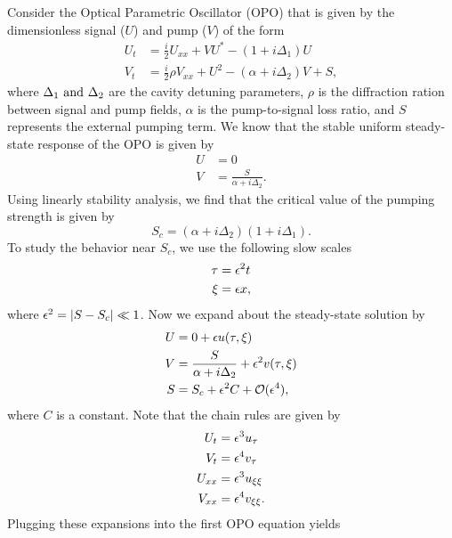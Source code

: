 \documentclass[12pt]{report}
\begin{document}
\begin{solution}
    
    \noindent
    Consider the Optical Parametric Oscillator (OPO) that is given by the dimensionless signal ($U$) and pump ($V$) of the form
    \begin{align*}
        U_t &= \frac{i}{2}U_{xx} + VU^* - (1 + i \Delta_1)U\\
        V_t &= \frac{i}{2}\rho V_{xx} + U^2 - (\alpha + i \Delta_2)V + S,
    \end{align*}
    where $\Delta_1 {~\text{and}~} \Delta_2$ are the cavity detuning parameters, $\rho$ is the diffraction ration between signal and pump fields, $\alpha$ is the pump-to-signal loss ratio, and $S$ represents the external pumping term. We know that the stable uniform steady-state response of the OPO is given by
    \begin{align*}
        U &= 0\\
        V &= \frac{S}{\alpha + i \Delta_2}.
    \end{align*}
    Using linearly stability analysis, we find that the critical value of the pumping strength is given by
    \begin{equation*}
        S_c = (\alpha + i \Delta_2)(1 + i\Delta_1).
    \end{equation*}
    To study the behavior near $S_c$, we use the following slow scales
    \begin{align*}
        \tau &= {\epsilon}^2 t\\
        \xi &= {\epsilon} x,
    \end{align*}
    where ${\epsilon}^2 = |S - S_c| \ll  1$. Now we expand about the steady-state solution by
    \begin{align*}
        U &= 0 + {\epsilon} u(\tau, \xi)\\
        V &= \frac{S}{\alpha + i \Delta_2} + {\epsilon}^2 v(\tau, \xi)\\
        S &= S_c + {\epsilon}^2 C + {\mathcal{O}}({\epsilon}^4),
    \end{align*}
    where $C$ is a constant. Note that the chain rules are given by
    \begin{align*}
        U_t &= {\epsilon}^3 u_\tau\\
        V_t &= {\epsilon}^4 v_\tau\\
        U_{xx} &= {\epsilon}^3 u_{\xi\xi}\\
        V_{xx} &= {\epsilon}^4 v_{\xi\xi}.
    \end{align*}
    Plugging these expansions into the first OPO equation yields
    \begin{align}

\end{align}
\end{solution}
\end{document}
